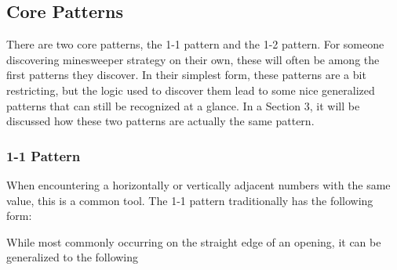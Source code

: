 \subsection{Core Patterns}
There are two core patterns, the 1-1 pattern and the 1-2 pattern. For someone discovering minesweeper strategy on their own, these will often be among the first patterns they discover. In their simplest form, these patterns are a bit restricting, but the logic used to discover them lead to some nice generalized patterns that can still be recognized at a glance. In a Section 3, it will be discussed how these two patterns are actually the same pattern.
\subsubsection*{1-1 Pattern}
When encountering a horizontally or vertically adjacent numbers with the same value, this is a common tool. The 1-1 pattern traditionally has the following form:

\begin{center}
    \begin{minipage}{0.2\linewidth}\centering\resizebox{1\linewidth}{!}{\begin{minesweeperboard}
        \celldc \& \cellunk \& \cellunk \& \cellsafe\\
        \celldc \& \cellone \& \cellone \& \celldc\\
        \celldc \& \cellzero \& \cellzero \& \cellzero\\
    \end{minesweeperboard}}\end{minipage}
\end{center}

While most commonly occurring on the straight edge of an opening, it can be generalized to the following


